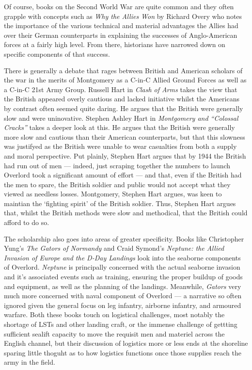 \documentclass[noraggedright]{turabian-researchpaper}
\begin{document}
Of course, books on the Second World War are quite common and they often
grapple with concepts such as \textit{Why the Allies Won} by Richard Overy
who notes the importance of the various technical and material advantages the 
Allies had over their German counterparts in explaining the successes of 
Anglo-American forces at a fairly high level.%
From there, historians have narrowed down on specific components of that
success.  

There is generally a debate that rages between British and American scholars
of the war in the merits of Montgomery as a C-in-C Allied Ground Forces as
well as a C-in-C 21st Army Group.  Russell Hart in \textit{Clash of Arms} takes
the view that the British appeared overly cautious and lacked initiative whilst 
the Americans by contrast often seemed quite daring.%
He argues that the British were generally slow and
were uninovative.  Stephen Ashley Hart in \textit{Montgomery and ``Colossal
Cracks''} takes a deeper look at this.  He argues that the British were 
generally more slow and cautious than their American counterparts, but that 
this slowness was justifyed as the British were unable to wear casualties from
both a supply and moral perspective.  Put plainly, Stephen Hart argues that by 
1944 the British had run out of men --- indeed, just scraping together the 
numbers to launch Overlord took a significant amount of effort\autocite[56-7]
{cracks}
--- and that, even if the British had the men to spare, the British soldier 
and public would not accept what they 
viewed as needless losses.\autocite[24-5]{cracks}  
Montgomery, Stephen Hart argues, was keen to maintian the `fighting spirit'
of the British soldier.  Thus, Stephen Hart argues that, whilst the British
methods were slow and methodical, that the British could afford to do so.  

The scholarship also goes into areas of greater specificity.  Books like 
Christopher Yung's \textit{The Gators of Normandy} and Craid Symond's 
\textit{Neptune: the Allied Invasion of Europe and the D-Day Landings} 
look into the seaborne components of Overlord.  \textit{Neptune} is 
principally concerned with the actual seaborne invasion and it's associated
events such as training, ensuring the proper buildup of goods and equipment, 
as well as the planning of the landings.\autocite[xvi-xvii]{neptune}  
Meanwhile, \textit{Gators} very much more concerned with naval component of 
Overlord --- a narrative so often ignored given the general focus on leg 
infantry, airborne infantry, and armoured warfare. %
Both these books touch on logistical challenges, most notably the shortage
of LSTs and other landing craft, or the immense challenge of gettting 
sufficient sealift capacity to move the requisit men and materiel across
the English channel, but their discussion of logistics more or less ends
at the shoreline sparing little thoguht as to how logistics functions once
those supplies reach the army in the field.
\end{document}
